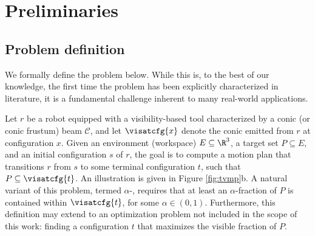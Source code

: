 \section{Preliminaries}
\label{sec:preliminaries}




\subsection{Problem definition}
We formally define the \tvmp problem below. While this is, to the best of our knowledge, the first time the problem has been explicitly characterized in literature, it is a fundamental challenge inherent to many real-world applications.

Let $r$ be a robot equipped with a visibility-based tool characterized by a conic (or conic frustum) \fov beam $\mathcal{C}$, and let $\visatcfg{x}$ denote the conic \fov emitted from $r$ at configuration $x$. Given an environment (workspace) $E \subseteq \R^3$, a target set $P\subseteq E$, and an initial configuration $s$ of $r$, the goal is to compute a motion plan that transitions $r$ from $s$ to some terminal configuration $t$, such that $P\subseteq \visatcfg{t}$. An illustration is given in Figure \ref{fig:tvmp}b. A natural variant of this problem, termed $\alpha$-\tvmp, requires that at least an $\alpha$-fraction of $P$ is contained within $\visatcfg{t}$, for some $\alpha \in (0, 1)$. Furthermore, this definition may extend to an optimization problem not included in the scope of this work: finding a configuration $t$ that maximizes the visible fraction of $P$.



